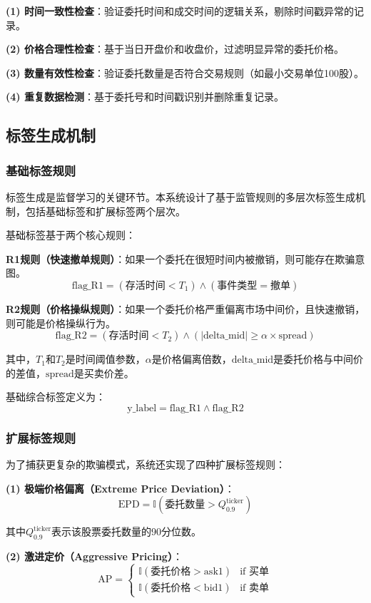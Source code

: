 \documentclass[12pt,a4paper]{article}
\begin{document}
\textbf{(1) 时间一致性检查}：验证委托时间和成交时间的逻辑关系，剔除时间戳异常的记录。

\textbf{(2) 价格合理性检查}：基于当日开盘价和收盘价，过滤明显异常的委托价格。

\textbf{(3) 数量有效性检查}：验证委托数量是否符合交易规则（如最小交易单位100股）。

\textbf{(4) 重复数据检测}：基于委托号和时间戳识别并删除重复记录。

\subsection{标签生成机制}

\subsubsection{基础标签规则}

标签生成是监督学习的关键环节。本系统设计了基于监管规则的多层次标签生成机制，包括基础标签和扩展标签两个层次。

基础标签基于两个核心规则：

\textbf{R1规则（快速撤单规则）}：如果一个委托在很短时间内被撤销，则可能存在欺骗意图。
$$\text{flag\_R1} = (\text{存活时间} < T_1) \land (\text{事件类型} = \text{撤单})$$

\textbf{R2规则（价格操纵规则）}：如果一个委托价格严重偏离市场中间价，且快速撤销，则可能是价格操纵行为。
$$\text{flag\_R2} = (\text{存活时间} < T_2) \land (|\text{delta\_mid}| \geq \alpha \times \text{spread})$$

其中，$T_1$和$T_2$是时间阈值参数，$\alpha$是价格偏离倍数，$\text{delta\_mid}$是委托价格与中间价的差值，$\text{spread}$是买卖价差。

基础综合标签定义为：
$$\text{y\_label} = \text{flag\_R1} \land \text{flag\_R2}$$

\subsubsection{扩展标签规则}

为了捕获更复杂的欺骗模式，系统还实现了四种扩展标签规则：

\textbf{(1) 极端价格偏离（Extreme Price Deviation）}：
$$\text{EPD} = \mathbb{I}(\text{委托数量} > Q_{0.9}^{\text{ticker}})$$

其中$Q_{0.9}^{\text{ticker}}$表示该股票委托数量的90分位数。

\textbf{(2) 激进定价（Aggressive Pricing）}：
$$\text{AP} = \begin{cases}
\mathbb{I}(\text{委托价格} > \text{ask1}) & \text{if 买单} \\
\mathbb{I}(\text{委托价格} < \text{bid1}) & \text{if 卖单}
\end{cases}$$
\end{document}
